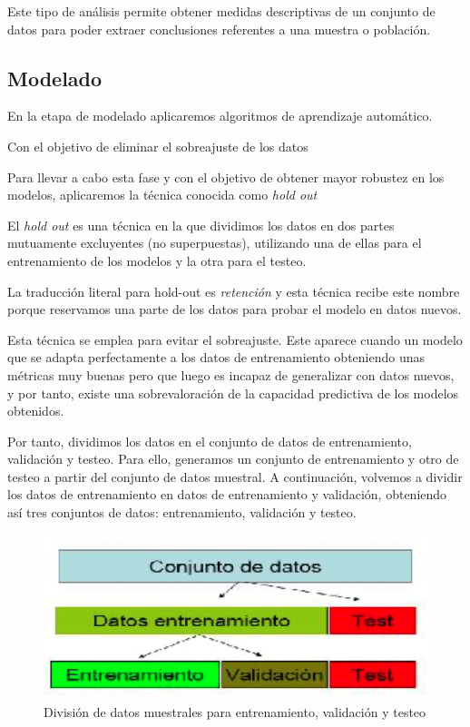 \documentclass[12pt,a4paper,]{book}
\numberwithin{dummy}{section}
\theoremstyle{ocrenumbox}
\theoremstyle{blacknumex}
\theoremstyle{blacknumbox}
\theoremstyle{ocrenum}
\theoremstyle{ocrenum}
\begin{document}
Este tipo de análisis permite obtener medidas descriptivas de un
conjunto de datos para poder extraer conclusiones referentes a una
muestra o población.

\hypertarget{modelado}{%
\subsection{Modelado}\label{modelado}}

En la etapa de modelado aplicaremos algoritmos de aprendizaje
automático.

Con el objetivo de eliminar el sobreajuste de los datos

Para llevar a cabo esta fase y con el objetivo de obtener mayor robustez
en los modelos, aplicaremos la técnica conocida como \emph{hold out}

El \emph{hold out} es una técnica en la que dividimos los datos en dos
partes mutuamente excluyentes (no superpuestas), utilizando una de ellas
para el entrenamiento de los modelos y la otra para el testeo.

La traducción literal para hold-out es \emph{retención} y esta técnica
recibe este nombre porque reservamos una parte de los datos para probar
el modelo en datos nuevos.

Esta técnica se emplea para evitar el sobreajuste. Este aparece cuando
un modelo que se adapta perfectamente a los datos de entrenamiento
obteniendo unas métricas muy buenas pero que luego es incapaz de
generalizar con datos nuevos, y por tanto, existe una sobrevaloración de
la capacidad predictiva de los modelos obtenidos.

Por tanto, dividimos los datos en el conjunto de datos de entrenamiento,
validación y testeo. Para ello, generamos un conjunto de entrenamiento y
otro de testeo a partir del conjunto de datos muestral. A continuación,
volvemos a dividir los datos de entrenamiento en datos de entrenamiento
y validación, obteniendo así tres conjuntos de datos: entrenamiento,
validación y testeo.

\begin{figure}
\centering
\includegraphics{graficos/DivisionEnt_Val_Test.png}
\caption{División de datos muestrales para entrenamiento, validación y
testeo}
\end{figure}
\end{document}
